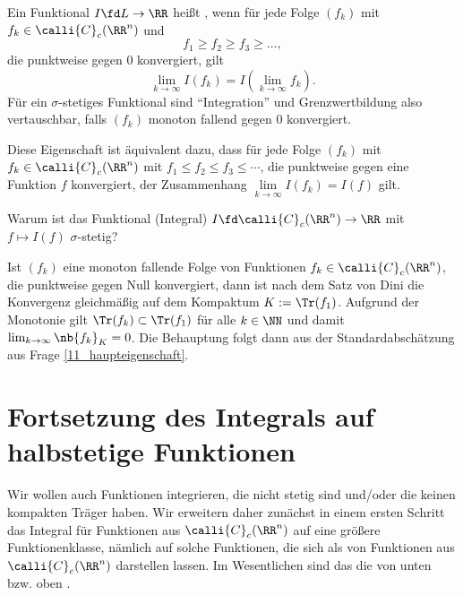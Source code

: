 \begin{antwort}
  Ein Funktional $I \fd L\to \RR$ hei{\ss}t 
  , wenn f\"ur jede Folge 
  $(f_k)$ mit $f_k\in\calli{C}_c( \RR^n )$ und 
  \[
  f_1 \ge f_2 \ge f_3 \ge \ldots, 
  \]
  die punktweise gegen $0$ konvergiert, gilt
  \[
  \lim_{k\to\infty} I(f_k) = I (\lim_{k\to\infty} f_k).
  \]
  Für ein $\sigma$-stetiges Funktional sind "`Integration"' und 
  Grenzwertbildung also vertauschbar, falls $(f_k)$ monoton fallend 
  gegen $0$ konvergiert.

  Diese Eigenschaft ist äquivalent dazu, 
  dass für jede Folge $(f_k)$ mit $f_k\in\calli{C}_c(\RR^n)$ mit 
  $f_1 \le f_2 \le f_3 \le \cdots $, die punktweise gegen eine 
  Funktion $f$ konvergiert, der Zusammenhang 
  $\lim\limits_{k\to\infty} I(f_k)=I(f)$ gilt.   
  \AntEnd 
\end{antwort}

\begin{frage}
  Warum ist das Funktional (Integral) $I \fd \calli{C}_c (\RR^n ) 
  \to \RR$ mit $f \mapsto I(f)$ $\sigma$-stetig?
\end{frage}

\begin{antwort}
  Ist $(f_k)$ eine monoton fallende Folge von Funktionen 
  $f_k\in \calli{C}_c(\RR^n)$, die punktweise gegen 
  Null konvergiert, dann ist nach dem Satz von Dini die Konvergenz 
  gleichm\"a{\ss}ig auf 
  dem Kompaktum $K:= \Tr(f_1)$. Aufgrund der Monotonie 
  gilt $\Tr(f_{k}) \subset \Tr(f_1)$ f\"ur alle $k\in \NN$  
  und damit $\lim_{k\to\infty} \nb{f_k}_K=0$. Die 
  Behauptung folgt dann aus der Standardabsch\"atzung  aus 
  Frage \ref{11_haupteigenschaft}.
  \AntEnd
\end{antwort}




\section{Fortsetzung des Integrals auf halbstetige Funktionen}


Wir wollen auch Funktionen integrieren, die nicht stetig sind und/oder die 
keinen kompakten Tr\"ager haben. Wir erweitern daher zun\"achst in einem ersten 
Schritt das Integral f\"ur Funktionen aus $\calli{C}_c ( \RR^n )$ 
auf eine gr\"o{\ss}ere 
Funktionenklasse, n\"amlich auf solche 
Funktionen, die sich als  
von Funktionen aus $\calli{C}_c(\RR^n)$ darstellen 
lassen. Im Wesentlichen sind das die von unten bzw. oben .

